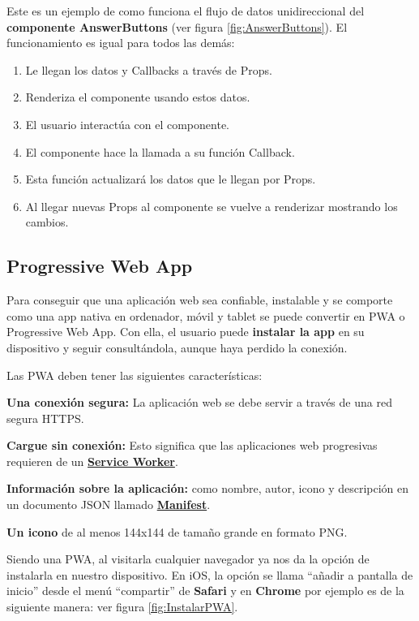 \documentclass[12pt,twoside,titlepage]{report}
\begin{document}
Este es un ejemplo de como funciona el flujo de datos unidireccional del \textbf{componente AnswerButtons} (ver figura \ref{fig:AnswerButtons}). El funcionamiento es igual para todos las demás: 

\begin{enumerate}
    \item Le llegan los datos y Callbacks a través de Props.
    \item Renderiza el componente usando estos datos.
    \item El usuario interactúa con el componente.
    \item El componente hace la llamada a su función Callback.
    \item Esta función actualizará los datos que le llegan por Props.
    \item Al llegar nuevas Props al componente se vuelve a renderizar mostrando los cambios.
\end{enumerate}


\subsection{Progressive Web App}
Para conseguir que una aplicación web sea confiable, instalable y se comporte como una app nativa en ordenador, móvil y tablet se puede convertir en PWA o Progressive Web App. Con ella, el usuario puede \textbf{instalar la app} en su dispositivo y seguir consultándola, aunque haya perdido la conexión.
\cite{pwa1}

Las PWA deben tener las siguientes características:

\begin{compactitem}

    \item \textbf{Una conexión segura:} La aplicación web se debe servir a través de una red segura HTTPS.
    \item \textbf{Cargue sin conexión:} Esto significa que las aplicaciones web progresivas requieren de un \hyperref[sec:serviceWorker]{\textbf{Service Worker}}.
    \item \textbf{Información sobre la aplicación:} como nombre, autor, icono y descripción en un documento JSON llamado \hyperref[sec:manifest]{\textbf{Manifest}}.
    \item \textbf{Un icono} de al menos 144x144 de tamaño grande en formato PNG.
\end{compactitem}

Siendo una PWA, al visitarla cualquier navegador ya nos da la opción de instalarla en nuestro dispositivo. En iOS, la opción se llama ``añadir a pantalla de inicio'' desde el menú ``compartir'' de \textbf{Safari} y en \textbf{Chrome} por ejemplo es de la siguiente manera: ver figura \ref{fig:InstalarPWA}.
\end{document}

